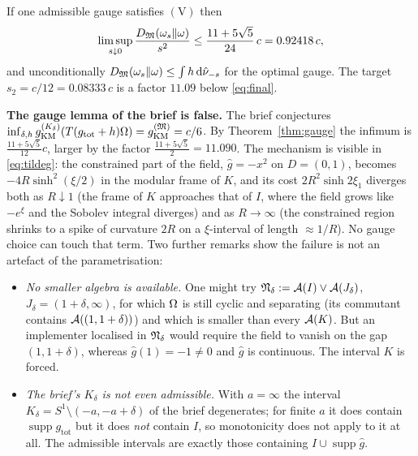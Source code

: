 \documentclass[11pt]{article}
\newcommand{\gtot}{g_{\mathrm{tot}}}\newcommand{\ktil}{\tilde k}
\newcommand{\gKM}{g_{\mathrm{KM}}}\newcommand{\gB}{g_{\mathrm B}}
\newcommand{\supp}{\operatorname{supp}}\newcommand{\Ad}{\operatorname{Ad}}
\begin{document}
\begin{corollary}\label{cor:final}
If one admissible gauge satisfies $(\mathrm V)$ then
\begin{equation}\label{eq:final}
 \limsup_{s\downarrow0}\frac{D_{\mathfrak M}(\omega_s\Vert\omega)}{s^2}\le\frac{11+5\sqrt5}{24}\,c=0.92418\,c,
\end{equation}
and unconditionally $D_{\mathfrak M}(\omega_s\Vert\omega)\le\int h\,\mathrm d\hat\nu_{-s}$ for the optimal gauge.  The target
$s_2=c/12=0.08333\,c$ is a factor $11.09$ below \eqref{eq:final}.
\end{corollary}

\begin{verdictbreak}
\textbf{The gauge lemma of the brief is false.}  The brief conjectures
$\inf_{\delta,h}\gKM^{(K_\delta)}(T(\gtot+h)\Om)=\gKM^{(\cM)}=c/6$.  By Theorem~\ref{thm:gauge} the infimum
is $\frac{11+5\sqrt5}{12}c$, larger by the factor $\frac{11+5\sqrt5}2=11.090$.  The mechanism is visible in
\eqref{eq:tildeg}: the constrained part of the field, $\hat g=-x^2$ on $D=(0,1)$, becomes
$-4R\sinh^2(\xi/2)$ in the modular frame of $K$, and its cost $2R^2\sinh2\xi_1$ diverges both as
$R\downarrow1$ (the frame of $K$ approaches that of $I$, where the field grows like $-e^\xi$ and the
Sobolev integral diverges) and as $R\to\infty$ (the constrained region shrinks to a spike of curvature
$2R$ on a $\xi$-interval of length $\approx1/R$).  No gauge choice can touch that term.  Two further
remarks show the failure is not an artefact of the parametrisation:
\begin{itemize}[leftmargin=1.6em]
\item \emph{No smaller algebra is available.}  One might try $\mathfrak N_\delta:=\mathcal A(I)\vee\mathcal A(J_\delta)$,
 $J_\delta=(1+\delta,\infty)$, for which $\Omega$ is still cyclic and separating (its commutant contains
 $\mathcal A((1,1+\delta))$) and which is smaller than every $\mathcal A(K)$.  But an implementer localised in
 $\mathfrak N_\delta$ would require the field to vanish on the gap $(1,1+\delta)$, whereas
 $\hat g(1)=-1\ne0$ and $\hat g$ is continuous.  The interval $K$ is forced.
\item \emph{The brief's $K_\delta$ is not even admissible.}  With $a=\infty$ the interval
 $K_\delta=S^1\setminus(-a,-a+\delta)$ of the brief degenerates; for finite $a$ it does contain
 $\supp\gtot$ but it does \emph{not} contain $I$, so monotonicity does not apply to it at all.  The
 admissible intervals are exactly those containing $I\cup\supp\hat g$.
\end{itemize}
\end{verdictbreak}
\end{document}
